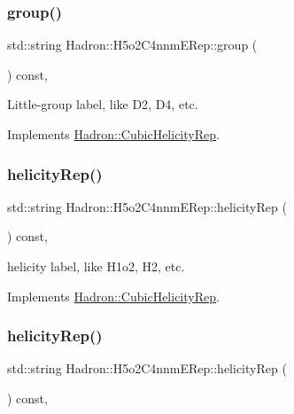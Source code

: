 \subsubsection{\texorpdfstring{group()}{group()}\hspace{0.1cm}{\footnotesize\ttfamily [2/2]}}
{\footnotesize\ttfamily std\+::string Hadron\+::\+H5o2\+C4nnm\+E\+Rep\+::group (\begin{DoxyParamCaption}{ }\end{DoxyParamCaption}) const\hspace{0.3cm}{\ttfamily [inline]}, {\ttfamily [virtual]}}

Little-\/group label, like D2, D4, etc. 

Implements \mbox{\hyperlink{structHadron_1_1CubicHelicityRep_a101a7d76cd8ccdad0f272db44b766113}{Hadron\+::\+Cubic\+Helicity\+Rep}}.

\mbox{\label{structHadron_1_1H5o2C4nnmERep_acfb835153b5bdf1afdc5c7775912e546}} 
\subsubsection{\texorpdfstring{helicityRep()}{helicityRep()}\hspace{0.1cm}{\footnotesize\ttfamily [1/2]}}
{\footnotesize\ttfamily std\+::string Hadron\+::\+H5o2\+C4nnm\+E\+Rep\+::helicity\+Rep (\begin{DoxyParamCaption}{ }\end{DoxyParamCaption}) const\hspace{0.3cm}{\ttfamily [inline]}, {\ttfamily [virtual]}}

helicity label, like H1o2, H2, etc. 

Implements \mbox{\hyperlink{structHadron_1_1CubicHelicityRep_af1096946b7470edf0a55451cc662f231}{Hadron\+::\+Cubic\+Helicity\+Rep}}.

\mbox{\label{structHadron_1_1H5o2C4nnmERep_acfb835153b5bdf1afdc5c7775912e546}} 
\subsubsection{\texorpdfstring{helicityRep()}{helicityRep()}\hspace{0.1cm}{\footnotesize\ttfamily [2/2]}}
{\footnotesize\ttfamily std\+::string Hadron\+::\+H5o2\+C4nnm\+E\+Rep\+::helicity\+Rep (\begin{DoxyParamCaption}{ }\end{DoxyParamCaption}) const\hspace{0.3cm}{\ttfamily [inline]}, {\ttfamily [virtual]}}

